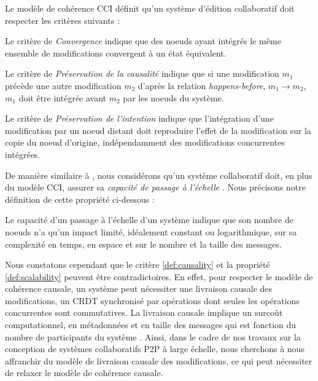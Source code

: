 \begin{definition}
  Le modèle de cohérence \acl{CCI} définit qu'un système d'édition collaboratif doit respecter les critères suivants :
  \begin{subdefinition}[Convergence]
    Le critère de \emph{Convergence} indique que des noeuds ayant intégrés le même ensemble de modifications convergent à un état équivalent.
  \end{subdefinition}
  \begin{subdefinition}
    \label{def:causality}
    Le critère de \emph{Préservation de la causalité} indique que si une modification $m_1$ précède une autre modification $m_2$ d'après la relation \emph{happens-before}, \ie $m_1 \rightarrow m_2$, $m_1$ doit être intégrée avant $m_2$ par les noeuds du système.
  \end{subdefinition}
  \begin{subdefinition}
    Le critère de \emph{Préservation de l'intention} indique que l'intégration d'une modification par un noeud distant doit reproduire l'effet de la modification sur la copie du noeud d'origine, indépendamment des modifications concurrentes intégrées.
  \end{subdefinition}
\end{definition}

De manière similaire à \cite{2009-logoot-weiss}, nous considérons qu'un système collaboratif doit, en plus du modèle \ac{CCI}, assurer sa \emph{capacité de passage à l'échelle} .
Nous précisons notre définition de cette propriété ci-dessous :

\begin{definition}
  \label{def:scalability}
  Le capacité d'un passage à l'échelle d'un système indique que son nombre de noeuds n'a qu'un impact limité, \ie idéalement constant ou logarithmique, sur sa complexité en temps, en espace et sur le nombre et la taille des messages.
\end{definition}

Nous constatons cependant que le critère \ref{def:causality} et la propriété \ref{def:scalability} peuvent être contradictoires.
En effet, pour respecter le modèle de cohérence causale, un système peut nécessiter une livraison causale des modifications, \eg un \ac{CRDT} synchronisé par opérations dont seules les opérations concurrentes sont commutatives.
La livraison causale implique un surcoût computationnel, en métadonnées et en taille des messages qui est fonction du nombre de participants du système \cite{1991-concerning-size-logical-clocks-charron-bost}.
Ainsi, dans le cadre de nos travaux sur la conception de systèmes collaboratifs \ac{P2P} à large échelle, nous cherchons à nous affranchir du modèle de livraison causale des modifications, ce qui peut nécessiter de relaxer le modèle de cohérence causale.

